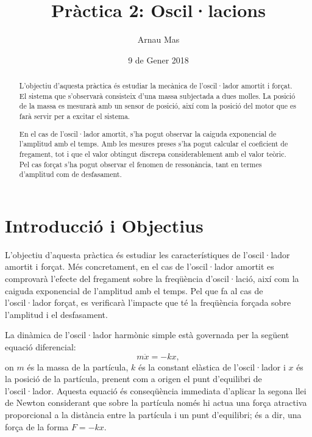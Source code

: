 \documentclass[12pt,a4paper]{article}
\title{\textsf{\textbf{Pràctica 2: Oscil·lacions}}}
\author{\textsf{Arnau Mas}}
\date{\textsf{9 de Gener 2018}}
\numberwithin{equation}{section}
\begin{document}

\begin{titlingpage}
 \maketitle

\noindent 


\begin{abstract}
	L'objectiu d'aquesta pràctica és estudiar la mecànica de l'oscil·lador amortit i forçat. El sistema que s'observarà consisteix d'una massa subjectada a dues molles. La posició de la massa es mesurarà amb un sensor de posició, així com la posició del motor que es farà servir per a excitar el sistema.

	En el cas de l'oscil·lador amortit, s'ha pogut observar la caiguda exponencial de l'amplitud amb el temps. Amb les mesures preses s'ha pogut calcular el coeficient de fregament, tot i que el valor obtingut discrepa considerablement amb el valor teòric. Pel cas forçat s'ha pogut observar el fenomen de ressonància, tant en termes d'amplitud com de desfasament. 
\end{abstract}

\end{titlingpage}

\begin{titlingpage}
\tableofcontents
\end{titlingpage}

\section{Introducció i Objectius}\label{sec:intro}
L'objectiu d'aquesta pràctica és estudiar les característiques de l'oscil·lador amortit i forçat. Més concretament, en el cas de l'oscil·lador amortit es comprovarà l'efecte del fregament sobre la freqüència d'oscil·lació, així com la caiguda exponencial de l'amplitud amb el temps. Pel que fa al cas de l'oscil·lador forçat, es verificarà l'impacte que té la freqüència forçada sobre l'amplitud i el desfasament.

La dinàmica de l'oscil·lador harmònic simple està governada per la següent equació diferencial:
\begin{equation}
 	m\ddot{x} = -kx, \label{eq:oscilador harmonic simple}
\end{equation}
on \( m \) és la massa de la partícula, \( k \) és la constant elàstica de l'oscil·lador i \( x \) és la posició de la partícula, prenent com a origen el punt d'equilibri de l'oscil·lador. Aquesta equació és conseqüència immediata d'aplicar la segona llei de Newton considerant que sobre la partícula només hi actua una força atractiva proporcional a la distància entre la partícula i un punt d'equilibri; és a dir, una força de la forma \( F = -kx \). 
\end{document}
